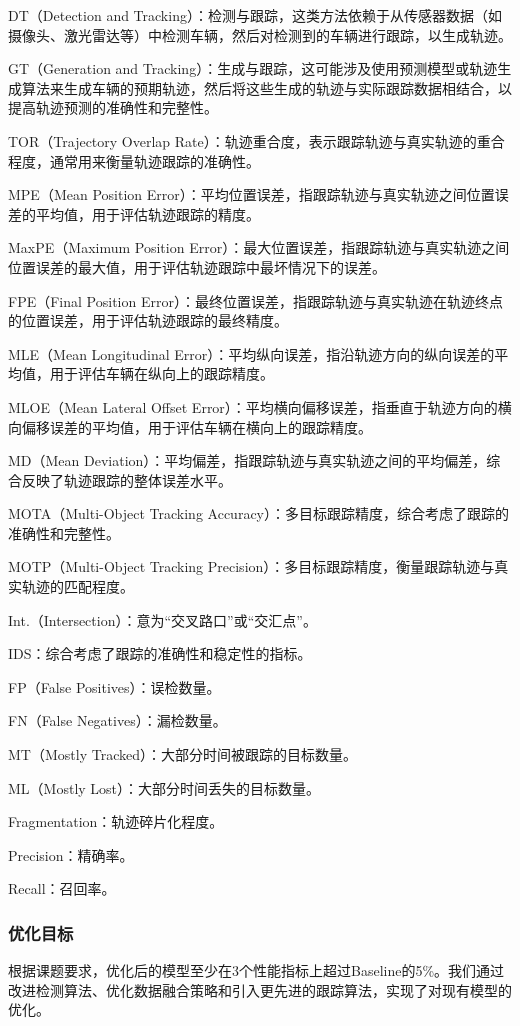 DT（Detection and Tracking）：检测与跟踪，这类方法依赖于从传感器数据（如摄像头、激光雷达等）中检测车辆，然后对检测到的车辆进行跟踪，以生成轨迹。

GT（Generation and Tracking）：生成与跟踪，这可能涉及使用预测模型或轨迹生成算法来生成车辆的预期轨迹，然后将这些生成的轨迹与实际跟踪数据相结合，以提高轨迹预测的准确性和完整性。

TOR（Trajectory Overlap Rate）：轨迹重合度，表示跟踪轨迹与真实轨迹的重合程度，通常用来衡量轨迹跟踪的准确性。

MPE（Mean Position Error）：平均位置误差，指跟踪轨迹与真实轨迹之间位置误差的平均值，用于评估轨迹跟踪的精度。

MaxPE（Maximum Position Error）：最大位置误差，指跟踪轨迹与真实轨迹之间位置误差的最大值，用于评估轨迹跟踪中最坏情况下的误差。

FPE（Final Position Error）：最终位置误差，指跟踪轨迹与真实轨迹在轨迹终点的位置误差，用于评估轨迹跟踪的最终精度。

MLE（Mean Longitudinal Error）：平均纵向误差，指沿轨迹方向的纵向误差的平均值，用于评估车辆在纵向上的跟踪精度。

MLOE（Mean Lateral Offset Error）：平均横向偏移误差，指垂直于轨迹方向的横向偏移误差的平均值，用于评估车辆在横向上的跟踪精度。

MD（Mean Deviation）：平均偏差，指跟踪轨迹与真实轨迹之间的平均偏差，综合反映了轨迹跟踪的整体误差水平。

MOTA（Multi-Object Tracking Accuracy）：多目标跟踪精度，综合考虑了跟踪的准确性和完整性。

MOTP（Multi-Object Tracking Precision）：多目标跟踪精度，衡量跟踪轨迹与真实轨迹的匹配程度。

Int.（Intersection）：意为“交叉路口”或“交汇点”。

IDS：综合考虑了跟踪的准确性和稳定性的指标。

FP（False Positives）：误检数量。

FN（False Negatives）：漏检数量。

MT（Mostly Tracked）：大部分时间被跟踪的目标数量。

ML（Mostly Lost）：大部分时间丢失的目标数量。

Fragmentation：轨迹碎片化程度。

Precision：精确率。

Recall：召回率。
\subsubsection{优化目标}
根据课题要求，优化后的模型至少在3个性能指标上超过Baseline的5\%。我们通过改进检测算法、优化数据融合策略和引入更先进的跟踪算法，实现了对现有模型的优化。







